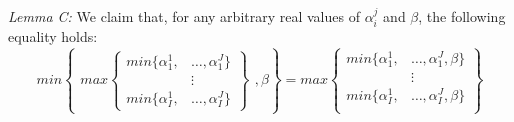 \documentclass{article} %
\begin{document}
\textit{Lemma C:} We claim that, for any arbitrary real values of $\alpha^j_i$ and $\beta$, the following equality holds:
\[
min
\left\{
  \begin{aligned}
    max\left\{
      \begin{aligned}
        min\{\alpha_1^1,&\ldots,\alpha_1^J\} \\
        &\vdots \\
        min\{\alpha_I^1,&\ldots,\alpha_I^J\}
      \end{aligned}
    \right\}
  \end{aligned}
  , \beta
\right\}
=
max\left\{
  \begin{aligned}
    min\{\alpha_1^1,&\ldots,\alpha_1^J,\beta\} \\
    &\vdots \\
    min\{\alpha_I^1,&\ldots,\alpha_I^J,\beta\} \\
  \end{aligned}
\right\}
\]
\end{document}
